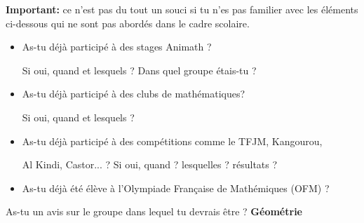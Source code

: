 \textbf{Important:} ce n'est pas du tout un souci si tu n'es pas familier avec les éléments ci-dessous qui ne sont pas abordés dans le cadre scolaire.

\ligne

\begin{itemize}


\item As-tu déjà participé à des stages Animath ?  \qquad {}  \qquad {}

Si oui, quand et lesquels ? Dans quel groupe étais-tu ?

\item As-tu déjà participé à des clubs de mathématiques?  \qquad {}  \qquad {}

Si oui, quand et lesquels ?



\item As-tu déjà participé à des compétitions comme le TFJM, Kangourou,  \qquad {}  \qquad {}

Al Kindi, Castor... ?  Si oui, quand ? lesquelles ? résultats ?  


\item As-tu déjà été élève à l'Olympiade Fran\c caise de Mathémiques (OFM) ?  \qquad {}  \qquad {}
\end{itemize}


\ligne

As-tu un avis sur le groupe dans lequel tu devrais être ?
\ligne
{\Large\textbf{Géométrie}}
\bigskip

